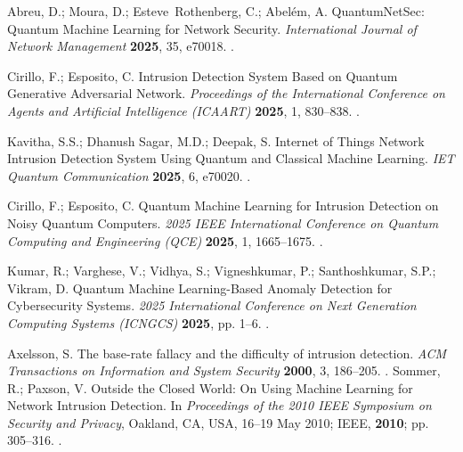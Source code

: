  Abreu, D.; Moura, D.; Esteve Rothenberg, C.; Abelém, A. QuantumNetSec: Quantum Machine Learning for Network Security. \emph{International Journal of Network Management} \textbf{2025}, 35, e70018. .

 Cirillo, F.; Esposito, C. Intrusion Detection System Based on Quantum Generative Adversarial Network. \emph{Proceedings of the International Conference on Agents and Artificial Intelligence (ICAART)} \textbf{2025}, 1, 830--838. .

 Kavitha, S.S.; Dhanush Sagar, M.D.; Deepak, S. Internet of Things Network Intrusion Detection System Using Quantum and Classical Machine Learning. \emph{IET Quantum Communication} \textbf{2025}, 6, e70020. .

 Cirillo, F.; Esposito, C. Quantum Machine Learning for Intrusion Detection on Noisy Quantum Computers. \emph{2025 IEEE International Conference on Quantum Computing and Engineering (QCE)} \textbf{2025}, 1, 1665--1675. .

 Kumar, R.; Varghese, V.; Vidhya, S.; Vigneshkumar, P.; Santhoshkumar, S.P.; Vikram, D. Quantum Machine Learning-Based Anomaly Detection for Cybersecurity Systems. \emph{2025 International Conference on Next Generation Computing Systems (ICNGCS)} \textbf{2025}, pp. 1--6. .

 Axelsson, S. The base-rate fallacy and the difficulty of intrusion detection. \emph{ACM Transactions on Information and System Security} \textbf{2000}, 3, 186--205. .
 Sommer, R.; Paxson, V. Outside the Closed World: On Using Machine Learning for Network Intrusion Detection. In \emph{Proceedings of the 2010 IEEE Symposium on Security and Privacy}, Oakland, CA, USA, 16--19 May 2010; IEEE, \textbf{2010}; pp. 305--316. .
